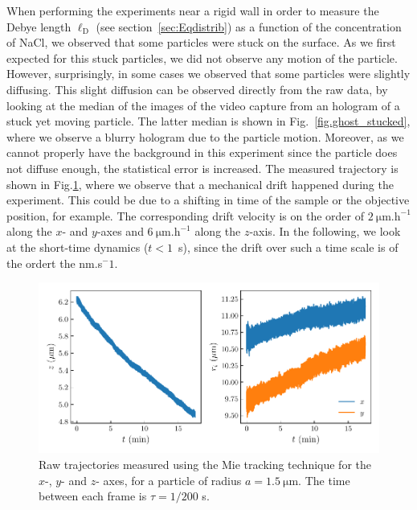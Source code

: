 When performing the experiments near a rigid wall in order to  measure the Debye length $\ell _\mathrm{D}$ (see section~\ref{sec:Eqdistrib}) as a function of the concentration of NaCl, we observed that some particles were stuck on the surface. As we first expected for this stuck particles, we did not observe any motion of the particle. However, surprisingly, in some cases we observed that some particles were slightly diffusing. This slight diffusion can be observed directly from the raw data, by looking at the median of the images of the video capture from an hologram of a stuck yet moving particle. The latter median is shown in Fig.~\ref{fig.ghost_stucked}, where we observe a blurry hologram due to the particle motion. Moreover, as we cannot properly have the background in this experiment since the particle does not diffuse enough, the statistical error is increased. The measured trajectory is shown in Fig.\ref{fig.trajectory_stuck}, where we observe that a mechanical drift happened during the experiment. This could be due to a shifting in time of the sample or the objective position, for example. The corresponding drift velocity is on the order of $2 ~ \mathrm{\mu m.h^{-1}}$ along the $x$- and $y$-axes and  $6 ~ \mathrm{\mu m.h^{-1}}$ along the $z$-axis. In the following, we look at the short-time dynamics ($t < 1$~s), since the drift over such a time scale is of the ordert the nm.s{$^-1$}.

\begin{figure}[H]
	\centering
	\includegraphics{02_body/chapter4/images/stucked_particle/trajectory_stucked.pdf}
	\caption{Raw trajectories measured using the Mie tracking technique for the $x$-, $y$- and $z$- axes, for a particle of radius $a=1.5 ~\mathrm{\mu m}$. The time between each frame is $\tau = 1/200$ s. ~\href{https://github.com/eXpensia/Confined-Brownian-Motion/blob/main/02_body/chapter4/images/stucked_particle/Full\%20analysis\%20trajectory_using_Dyacine_adding_x_y_distrib.ipynb}{\faGithub}}
	\label{fig.trajectory_stuck}
\end{figure}



